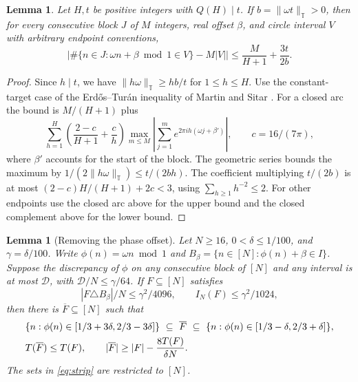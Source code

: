 \documentclass[11pt,reqno]{amsart}
\newtheorem{lemma}[theorem]{Lemma}
\newcommand{\T}{\mathbb T}
\numberwithin{equation}{section}
\begin{document}
\begin{lemma}\label{lem:discrepancy}
Let \(H,t\) be positive integers with \(Q(H)\mid t\).
If \(b=\|\omega t\|_\T>0\), then for every consecutive block \(J\)
of \(M\) integers, real offset \(\beta\), and circle interval \(V\)
with arbitrary endpoint conventions,
\begin{equation}\label{eq:discrepancy}
 \big|\#\{n\in J:\omega n+\beta\bmod1\in V\}-M|V|\big|
 \le \frac{M}{H+1}+\frac{3t}{2b}.
\end{equation}
\end{lemma}

\begin{proof}
Since \(h\mid t\), we have \(\|h\omega\|_\T\ge hb/t\)
for \(1\le h\le H\).
Use the constant-target case of the Erd\H{o}s--Tur\'an
inequality of Martin and Sitar \cite[Theorem~1.2]{martin-sitar}.
For a closed arc the bound is \(M/(H+1)\) plus
\[
 \sum_{h=1}^H \left(\frac{2-c}{H+1}+\frac{c}{h}\right)
  \max_{m\le M}\left|\sum_{j=1}^m e^{2\pi i h(\omega j+\beta')}\right|,
 \qquad c=16/(7\pi),
\]
where \(\beta'\) accounts for the start of the block.
The geometric series bounds the maximum by
\(1/(2\|h\omega\|_\T)\le t/(2bh)\).
The coefficient multiplying \(t/(2b)\) is at most
\((2-c)H/(H+1)+2c<3\), using \(\sum_{h\ge1}h^{-2}\le2\).
For other endpoints use the closed arc above for the upper
bound and the closed complement above for the lower bound.
\end{proof}

\begin{lemma}[Removing the phase offset]\label{lem:offset}
Let \(N\ge16\), \(0<\delta\le1/100\), and \(\gamma=\delta/100\).
Write \(\phi(n)=\omega n\bmod1\) and
\(B_\beta=\{n\in[N]:\phi(n)+\beta\in I\}\).
Suppose the discrepancy of \(\phi\) on any consecutive block
of \([N]\) and any interval is at most \(\mathcal D\), with
\(\mathcal D/N\le\gamma/64\). If \(F\subseteq[N]\) satisfies
\[
 |F\triangle B_\beta|/N\le\gamma^2/4096,\qquad
 I_N(F)\le\gamma^2/1024,
\]
then there is \(\overline F\subseteq[N]\) such that
\begin{align}
 &\{n:\phi(n)\in[1/3+3\delta,2/3-3\delta]\}
      \ \subseteq\ \overline F\
      \subseteq\ \{n:\phi(n)\in[1/3-\delta,2/3+\delta]\}, \label{eq:strip}\\
 &T(\overline F)\le T(F),\qquad
 |\overline F|\ge |F|-\frac{8T(F)}{\delta N}. \notag
\end{align}
The sets in \eqref{eq:strip} are restricted to \([N]\).
\end{lemma}
\end{document}

